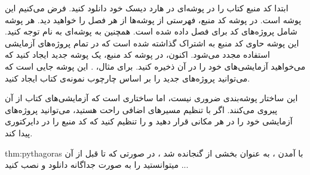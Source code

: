 {
    \Large
    \begin{spacing}{1.5}
        ابتدا کد منبع کتاب را در پوشه‌ای در هارد دیسک خود دانلود کنید.
        فرض می‌کنیم این پوشه  است.
        در پوشه کد منبع، فهرستی از پوشه‌ها از هر فصل را خواهید دید. هر پوشه شامل پروژه‌های کد برای فصل داده شده است.
        همچنین به پوشه‌ای به نام  توجه کنید. این پوشه حاوی کد منبع به اشتراک گذاشته شده است که در تمام پروژه‌های آزمایشی استفاده مجدد می‌شود.
        اکنون، در پوشه کد منبع، یک پوشه جدید ایجاد کنید که می‌خواهید آزمایشی‌های خود را در آن ذخیره کنید.
        برای مثال، . این پوشه جایی است که می‌توانید پروژه‌های جدید را بر اساس چارچوب نمونه‌ی کتاب ایجاد کنید.
    \end{spacing}
}
{
    \Large
    \begin{spacing}{1.5}
        این ساختار پوشه‌بندی ضروری نیست، اما ساختاری است که آزمایشی‌های کتاب از آن پیروی می‌کنند. اگر با تنظیم مسیر‌های اضافی راحت هستید، می‌توانید پروژه‌های آزمایشی خود را در هر مکانی قرار دهید و  را تنظیم کنید که کد منبع را در دایرکتوری  پیدا کند.
    \end{spacing}
}
\textbf{\vspace{25pt}}

\begin{theo}{thm:pythagoras}
    با آمدن ،  به عنوان بخشی از  گنجانده شد ، در صورتی که تا قبل از آن میتوانستید  را به صورت جداگانه دانلود و نصب کنید ...
    \\[برای\textbf{ اطلاعات بیشتر:}  \href{https://learn.microsoft.com/en-us/windows/win32/directx-sdk--august-2009-}{\lr{Where is the DirectX SDK?}}]
\end{theo}
\textbf{\vspace{6pt}}

\title{
    \Large
}
\textbf{\vspace{-10pt}}

